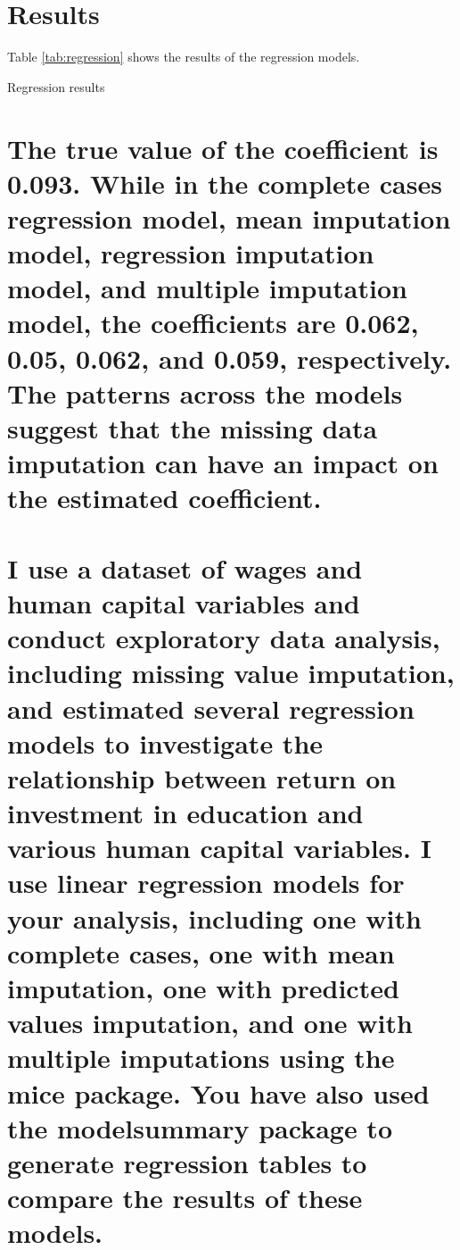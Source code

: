 \documentclass{article}
\begin{document}
\section{Results}

Table \ref{tab:regression} shows the results of the regression models.

\begin{table}[htbp]
  \centering
  \caption{Regression results}
  \label{tab:regression}
  
\end{table}

\section{The true value of the coefficient is 0.093. While in the complete cases regression model, mean imputation model, regression imputation model, and multiple imputation model, the coefficients are 0.062, 0.05, 0.062, and 0.059, respectively. The patterns across the models suggest that the missing data imputation can have an impact on the estimated coefficient.}


\section{I use a dataset of wages and human capital variables and conduct exploratory data analysis, including missing value imputation, and estimated several regression models to investigate the relationship between return on investment in education and various human capital variables.
I use linear regression models for your analysis, including one with complete cases, one with mean imputation, one with predicted values imputation, and one with multiple imputations using the mice package. You have also used the modelsummary package to generate regression tables to compare the results of these models.}
\end{document}
